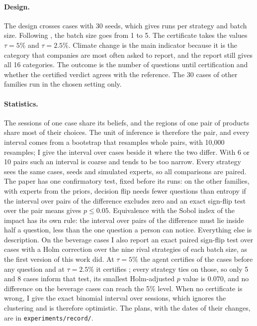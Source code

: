 \documentclass{article}
\begin{document}
\paragraph{Design.}
The design crosses \nCases{} cases with 30 seeds, which gives \nRuns{} runs per strategy and batch size.
Following \citet{faria2022}, the batch size goes from 1 to 5. The certificate takes the values
$\tau=5\%$ and $\tau=2.5\%$. Climate change is the main indicator because it is the category that
companies are most often asked to report, and the report still gives all 16 categories. The outcome is the number of
questions until certification and whether the certified verdict agrees with the reference. The 30 cases of other families run in the chosen setting only.

\paragraph{Statistics.}
The sessions of one case share its beliefs, and the regions of one pair of products share most of their
choices. The unit of inference is therefore the pair, and every interval comes from a bootstrap that
resamples whole pairs, with 10,000 resamples; I give the interval over cases beside it where the two
differ. With 6 or 10 pairs such an interval is coarse and tends to be too narrow. Every strategy sees the
same cases, seeds and simulated experts, so all comparisons are paired. The paper has one confirmatory
test, fixed before its runs: on the other families, with experts from the priors, decision flip needs
fewer questions than entropy if the interval over pairs of the difference excludes zero and an exact
sign-flip test over the pair means gives $p\le0.05$. Equivalence with the Sobol index of the impact has its
own rule: the interval over pairs of the difference must lie inside half a question, less than the one
question a person can notice. Everything else is description. On the beverage cases I also report an
exact paired sign-flip test over cases with a Holm correction over the nine rival strategies of each batch
size, as the first version of this work did. At $\tau=5\%$ the agent certifies \nNoQLoose{} of the \nCases{}
cases before any question and at $\tau=2.5\%$ it certifies \nNoQStrict{}; every strategy ties on those, so
only 5 and 8 cases inform that test, its smallest Holm-adjusted $p$ value is 0.070, and no difference on
the beverage cases can reach the 5\% level. When no certificate is wrong, I give the exact binomial
interval over sessions, which ignores the clustering and is therefore optimistic. The plans, with the
dates of their changes, are in \texttt{experiments/record/}.
\end{document}
